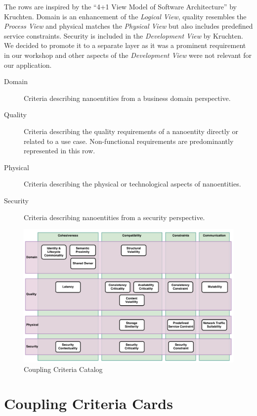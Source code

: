 \clearpage
The rows are inspired by the \enquote{4+1 View Model of Software Architecture} by Kruchten\cite{fourPlusOne}. Domain is an enhancement of the \textit{Logical View}, quality resembles the \textit{Process View} and physical matches the \textit{Physical View} but also includes predefined service constraints. Security is included in the \textit{Development View} by Kruchten. We decided to promote it to a separate layer as it was a prominent requirement in our workshop and other aspects of the \textit{Development View} were not relevant for our application.

\begin{description}
	\item[Domain] Criteria describing nanoentities from a business domain perspective.
	\item[Quality] Criteria describing the quality requirements of a nanoentity directly or related to a use case. Non-functional requirements are predominantly represented in this row.
	\item[Physical] Criteria describing the physical or technological aspects of nanoentities.
	\item[Security] Criteria describing nanoentities from a security perspective.
\end{description}

\begin{figure}[H]
	\includegraphics[scale=0.5]{diagrams/CouplingCatalog.pdf}
	\caption{Coupling Criteria Catalog}
	\label{fig:cc_grid}
\end{figure}

\clearpage
\section{Coupling Criteria Cards}
\label{sec:couplingCriteriaCards}

